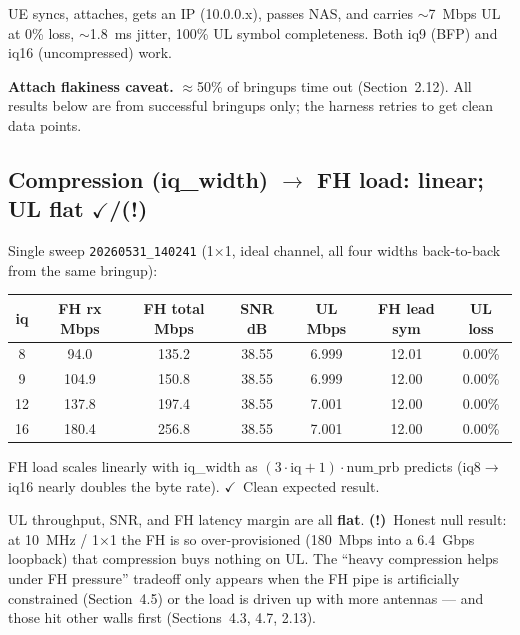 \documentclass[11pt,a4paper]{article}
\newcommand{\yes}{\textcolor{closedcol}{\ensuremath{\checkmark}}}
\newcommand{\warn}{\textcolor{orange!85!black}{\textbf{(!)}}}
\begin{document}
UE syncs, attaches, gets an IP (10.0.0.x), passes NAS, and carries $\sim$7~Mbps UL at 0\%
loss, $\sim$1.8~ms jitter, 100\% UL symbol completeness. Both iq9 (BFP) and iq16
(uncompressed) work.

\textbf{Attach flakiness caveat.} $\approx$50\% of bringups time out (Section~2.12). All
results below are from successful bringups only; the harness retries to get clean data points.

\subsection{Compression (iq\_width) $\rightarrow$ FH load: linear; UL flat
  \texorpdfstring{\yes/\warn}{[OK/!]}}

Single sweep \texttt{20260531\_140241} (1$\times$1, ideal channel, all four widths
back-to-back from the same bringup):

\begin{table}[h]\centering\small
\begin{tabular}{@{}c c c c c c c@{}}
\toprule
\textbf{iq} & \textbf{FH rx Mbps} & \textbf{FH total Mbps} & \textbf{SNR dB}
  & \textbf{UL Mbps} & \textbf{FH lead sym} & \textbf{UL loss} \\
\midrule
8  & 94.0  & 135.2 & 38.55 & 6.999 & 12.01 & 0.00\% \\
9  & 104.9 & 150.8 & 38.55 & 6.999 & 12.00 & 0.00\% \\
12 & 137.8 & 197.4 & 38.55 & 7.001 & 12.00 & 0.00\% \\
16 & 180.4 & 256.8 & 38.55 & 7.001 & 12.00 & 0.00\% \\
\bottomrule
\end{tabular}
\end{table}

FH load scales linearly with iq\_width as $(3 \cdot \text{iq} + 1) \cdot \text{num\_prb}$
predicts (iq8$\rightarrow$iq16 nearly doubles the byte rate). \yes\ Clean expected result.

UL throughput, SNR, and FH latency margin are all \textbf{flat}. \warn\ Honest null result:
at 10~MHz / 1$\times$1 the FH is so over-provisioned (180~Mbps into a 6.4~Gbps loopback)
that compression buys nothing on UL. The ``heavy compression helps under FH pressure''
tradeoff only appears when the FH pipe is artificially constrained (Section~4.5) or the load
is driven up with more antennas --- and those hit other walls first (Sections~4.3, 4.7, 2.13).
\end{document}
